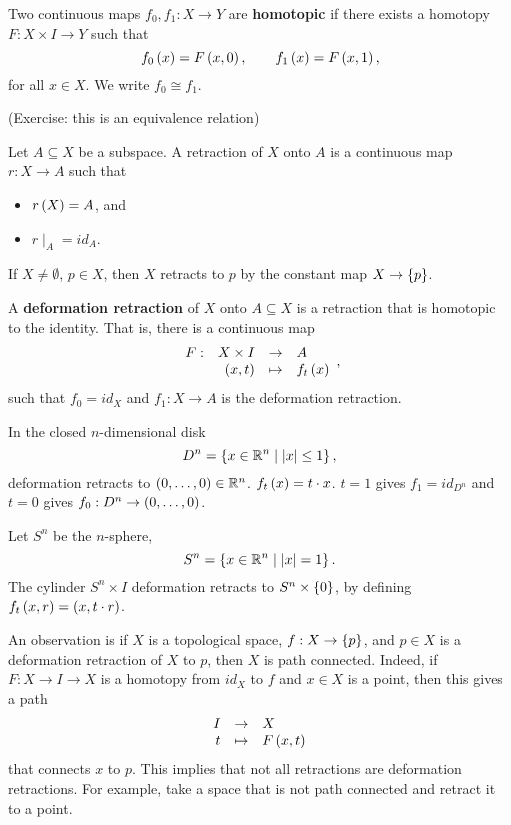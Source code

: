 \begin{definition}
Two continuous maps $ f_0, f_1 : X \to Y $ are \textbf{homotopic} if there exists a homotopy $ F : X \times I \to Y $ such that
$$ f_0\left( x \right) = F\left( x, 0 \right), \qquad f_1\left( x \right) = F\left( x, 1 \right), $$
for all $ x \in X $. We write $ f_0 \cong f_1 $.
\end{definition}

(Exercise: this is an equivalence relation)

\begin{definition}
Let $ A \subseteq X $ be a subspace. A retraction of $ X $ onto $ A $ is a continuous map $ r : X \to A $ such that
\begin{itemize}
\item $ r\left( X \right) = A $, and
\item $ r\mid_A = id_A $.
\end{itemize}
\end{definition}

\begin{example1}
If $ X \ne \emptyset $, $ p \in X $, then $ X $ retracts to $ p $ by the constant map $ X \to \left\{ p \right\} $.
\end{example1}

\begin{definition}
A \textbf{deformation retraction} of $ X $ onto $ A \subseteq X $ is a retraction that is homotopic to the identity. That is, there is a continuous map
$$ \function[F]{X \times I}{A}{\rb{x, t}}{f_t\rb{x}}, $$
such that $ f_0 = id_X $ and $ f_1 : X \to A $ is the deformation retraction.
\end{definition}

\begin{example1}
In the closed $ n $-dimensional disk
$$ D^n = \left\{ x \in \mathbb{R}^n \mid \left\lvert x \right\rvert \le 1 \right\}, $$
deformation retracts to $ \left( 0, \dots, 0 \right) \in \mathbb{R}^n $. $ f_t\left( x \right) = t \cdot x $. $ t = 1 $ gives $ f_1 = id_{D^n} $ and $ t = 0 $ gives $ f_0 : D^n \to \left( 0, \dots, 0 \right) $.
\end{example1}

\begin{example1}
Let $ S^n $ be the $ n $-sphere,
$$ S^n = \left\{ x \in \mathbb{R}^n \mid \left\lvert x \right\rvert = 1 \right\}. $$
The cylinder $ S^n \times I $ deformation retracts to $ S^n \times \left\{ 0 \right\} $, by defining $ f_t\left( x, r \right) = \left( x, t \cdot r \right) $.
\end{example1}

An observation is if $ X $ is a topological space, $ f : X \to \left\{ p \right\} $, and $ p \in X $ is a deformation retraction of $ X $ to $ p $, then $ X $ is path connected. Indeed, if $ F : X \to I \to X $ is a homotopy from $ id_X $ to $ f $ and $ x \in X $ is a point, then this gives a path
$$ \function{I}{X}{t}{F\rb{x, t}} $$
that connects $ x $ to $ p $. This implies that not all retractions are deformation retractions. For example, take a space that is not path connected and retract it to a point.

